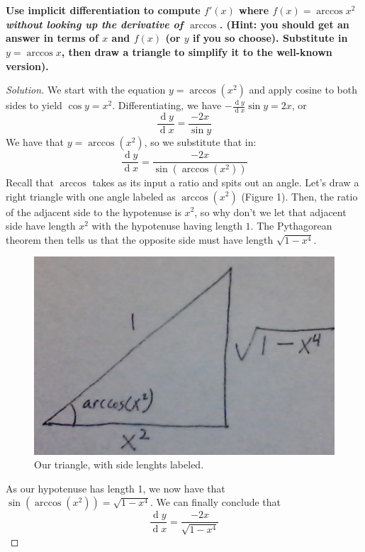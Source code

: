 \documentclass[english]{article}
\renewcommand{\d}[1]{\ensuremath{\operatorname{d}\!{#1}}}
\newcommand{\dydx}[2]{\frac{\d #1}{\d #2}}
\newcommand{\prob}[1]{\setcounter{section}{#1-1}\section{}}
\theoremstyle{remark}
\theoremstyle{definition}
\begin{document}
\prob{2} \textbf{Use implicit differentiation to compute $f'(x)$ where $f(x)=\arccos{x^2}$ \emph{without looking up the derivative of $\arccos$.} (Hint: you should get an answer in terms of $x$ and $f(x)$ (or $y$ if you so choose). Substitute in $y=\arccos x$, then draw a triangle to simplify it to the well-known version).}
\begin{proof}[Solution]
	We start with the equation $y=\arccos(x^2)$ and apply cosine to both sides to yield $\cos y=x^2$. Differentiating, we have $-\dydx{y}{x}\sin y=2x$, or $$\dydx{y}{x}=\frac{-2x}{\sin y}$$
	We have that $y=\arccos (x^2)$, so we substitute that in:
	$$\dydx{y}{x}=\frac{-2x}{\sin(\arccos(x^2))}$$
	Recall that $\arccos$ takes as its input a ratio and spits out an angle. Let's draw a right triangle with one angle labeled as $\arccos(x^2)$ (Figure 1). Then, the ratio of the adjacent side to the hypotenuse is $x^2$, so why don't we let that adjacent side have length $x^2$ with the hypotenuse having length $1$. The Pythagorean theorem then tells us that the opposite side must have length $\sqrt{1-x^4}$.
	
	\begin{figure}[h!]\centering
		\includegraphics[scale=.5]{triangle}\caption{Our triangle, with side lenghts labeled.}
	\end{figure}
	
	 As our hypotenuse has length 1, we now have that $\sin(\arccos(x^2))=\sqrt{1-x^4}$. We can finally conclude that $$\dydx{y}{x}=\frac{-2x}{\sqrt{1-x^4}}$$
\end{proof}
\end{document}
